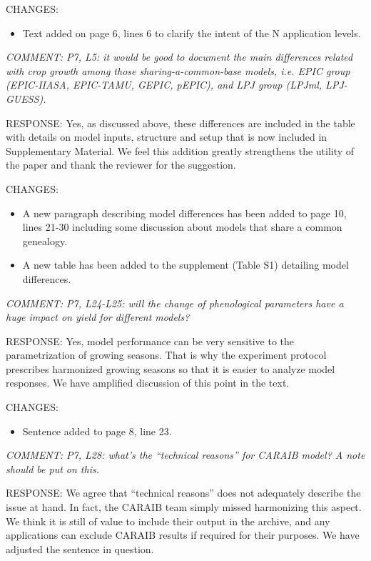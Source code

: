 \documentclass[gmd, manuscript]{copernicus} %
\begin{document}
CHANGES:
\begin{itemize}
    \item Text added on page 6, lines 6 to clarify the intent of the N application levels.
\end{itemize}

\smallskip

\textcolor{dark-gray}{\textit{COMMENT: P7, L5: it would be good to document the main differences related with crop growth among those sharing-a-common-base models, i.e. EPIC group (EPIC-IIASA, EPIC-TAMU, GEPIC, pEPIC), and LPJ group (LPJml, LPJ-GUESS).}}

RESPONSE: Yes, as discussed above, these differences are included in the table with details on model inputs, structure and setup that is now included in Supplementary Material. We feel this addition greatly strengthens the utility of the paper and thank the reviewer for the suggestion.
\smallskip

CHANGES:
\begin{itemize}
    \item A new paragraph describing model differences has been added to page 10, lines 21-30 including some discussion about models that share a common genealogy.
    \item A new table has been added to the supplement (Table S1) detailing model differences.
\end{itemize}

\smallskip

\textcolor{dark-gray}{\textit{COMMENT: P7, L24-L25: will the change of phenological parameters have a huge impact on yield for different models?}}

RESPONSE: Yes, model performance can be very sensitive to the parametrization of growing seasons. That is why the experiment protocol prescribes harmonized growing seasons so that it is easier to analyze model responses. We have amplified discussion of this point in the text.
\smallskip

CHANGES:
\begin{itemize}
    \item Sentence added to page 8, line 23.
\end{itemize}

\smallskip

\textcolor{dark-gray}{\textit{COMMENT: P7, L28: what’s the “technical reasons” for CARAIB model? A note should be put on this.}}

RESPONSE: We agree that “technical reasons” does not adequately describe the issue at hand. In fact, the CARAIB team simply missed harmonizing this aspect. We think it is still of value to include their output in the archive, and any applications can exclude CARAIB results if required for their purposes. We have adjusted the sentence in question.
\smallskip
\end{document}
